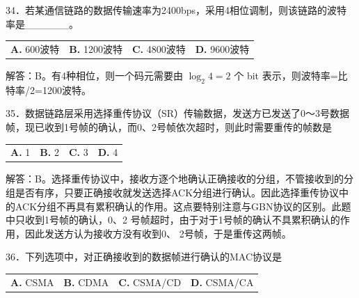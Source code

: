 \documentclass[UTF8,11pt]{ctexart}
\begin{document}
34．若某通信链路的数据传输速率为2400bps，采用4相位调制，则该链路的波特率是\_\_\_\_\_\_。


\begin{center}\begin{tabular}{>{\raggedright\arraybackslash}p{\dimexpr(\linewidth-8\tabcolsep)/4\relax}>{\raggedright\arraybackslash}p{\dimexpr(\linewidth-8\tabcolsep)/4\relax}>{\raggedright\arraybackslash}p{\dimexpr(\linewidth-8\tabcolsep)/4\relax}>{\raggedright\arraybackslash}p{\dimexpr(\linewidth-8\tabcolsep)/4\relax}}
\textbf{A.} 600波特 & \textbf{B.} 1200波特 & \textbf{C.} 4800波特 & \textbf{D.} 9600波特\\[.35em]\end{tabular}\end{center}

解答：B。有4种相位，则一个码元需要由 \(\displaystyle \log_2 4=2\) 个 bit 表示，则波特率=比特率/2=1200波特。


35．数据链路层采用选择重传协议（SR）传输数据，发送方已发送了0～3号数据帧，现已收到1号帧的确认，而0、2号帧依次超时，则此时需要重传的帧数是


\begin{center}\begin{tabular}{>{\raggedright\arraybackslash}p{\dimexpr(\linewidth-8\tabcolsep)/4\relax}>{\raggedright\arraybackslash}p{\dimexpr(\linewidth-8\tabcolsep)/4\relax}>{\raggedright\arraybackslash}p{\dimexpr(\linewidth-8\tabcolsep)/4\relax}>{\raggedright\arraybackslash}p{\dimexpr(\linewidth-8\tabcolsep)/4\relax}}
\textbf{A.} 1 & \textbf{B.} 2 & \textbf{C.} 3 & \textbf{D.} 4\\[.35em]\end{tabular}\end{center}

解答：B。选择重传协议中，接收方逐个地确认正确接收的分组，不管接收到的分组是否有序，只要正确接收就发送选择ACK分组进行确认。因此选择重传协议中的ACK分组不再具有累积确认的作用。这点要特别注意与GBN协议的区别。此题中只收到1号帧的确认，0、2 号帧超时，由于对于1号帧的确认不具累积确认的作用，因此发送方认为接收方没有收到0、 2号帧，于是重传这两帧。


36．下列选项中，对正确接收到的数据帧进行确认的MAC协议是


\begin{center}\begin{tabular}{>{\raggedright\arraybackslash}p{\dimexpr(\linewidth-8\tabcolsep)/4\relax}>{\raggedright\arraybackslash}p{\dimexpr(\linewidth-8\tabcolsep)/4\relax}>{\raggedright\arraybackslash}p{\dimexpr(\linewidth-8\tabcolsep)/4\relax}>{\raggedright\arraybackslash}p{\dimexpr(\linewidth-8\tabcolsep)/4\relax}}
\textbf{A.} CSMA & \textbf{B.} CDMA & \textbf{C.} CSMA/CD & \textbf{D.} CSMA/CA\\[.35em]\end{tabular}\end{center}
\end{document}
